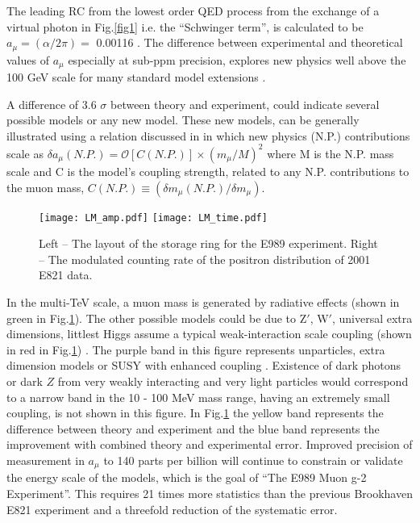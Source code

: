 \documentclass{article}
\begin{document}
The leading RC from the lowest order QED process from the exchange of a virtual
photon in Fig.\ref{fig1} i.e. the ``Schwinger term'', is calculated to be $a_{\mu} = (\alpha/2\pi) =$
0.00116 \cite{schwinger}. The difference between experimental and theoretical values of $a_{\mu}$
especially at sub-ppm precision, explores new physics well above the 100 GeV scale
for many standard model extensions \cite{benn}. 


A difference of 3.6 $\sigma$ \cite{davier} between theory and experiment, could indicate several possible
models or any new model. These new models, can be generally illustrated
using a relation discussed in \cite{ Czarnecki} in which new physics (N.P.) contributions scale as \cite{Dave} 
$\delta a_{\mu}(N.P.) =\mathcal{O}[C(N.P.)] \times ( m_{\mu}/M)^2 $ where M is the N.P. mass
scale and C is the model's coupling strength, related to any N.P. contributions to the muon
mass, $C(N.P.) \equiv (\delta m_{\mu}(N.P.)/\delta m_{\mu} )$.

\begin{figure}[H]
\centering
\texttt{[image: LM\_amp.pdf]}
\texttt{[image: LM\_time.pdf]}
\caption{\label{fig3}Left -- The layout of the storage ring for the E989 experiment. 
Right -- The modulated counting rate of the positron distribution of 2001 E821 data.}
\end{figure} 
In the multi-TeV scale, a muon mass is generated by radiative effects (shown in green in Fig.\ref{fig3}). 
The other possible models could be due to Z$'$, W$'$, universal extra dimensions,
littlest Higgs assume a typical weak-interaction scale coupling (shown in red in Fig.\ref{fig3}) \cite{Dave}.
The purple band in this figure represents 
unparticles, extra dimension models or SUSY with enhanced coupling \cite{Gorringe}. 
Existence of dark photons or dark $Z$ \cite{Davoudiasl:2012ig} 
from very weakly interacting and very 
light particles would correspond to a narrow band in the 10 - 100 MeV
mass range, having an extremely small coupling, is not shown in this figure. 
In Fig.\ref{fig3} the yellow band represents the difference between theory and experiment and
the blue band represents the improvement with combined theory and experimental error.
Improved precision of measurement in $a_{\mu}$ to 140 parts per billion will continue to
constrain or validate the energy scale of the models, which is the goal of ``The E989 
Muon g-2 Experiment''. This requires 21 times more statistics than the previous
Brookhaven E821 experiment and a threefold reduction of the systematic error.
           
\end{document}

